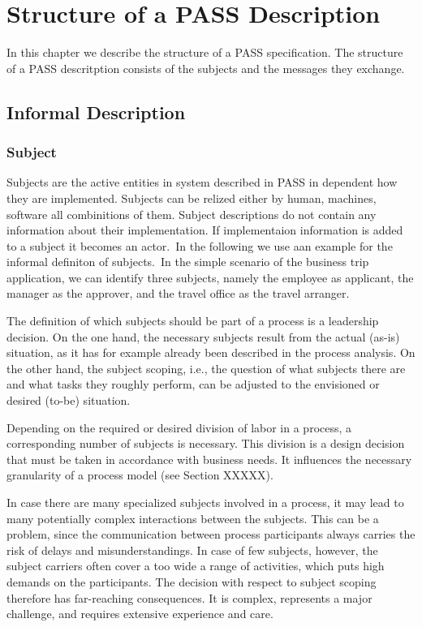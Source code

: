 \chapter{Structure of a PASS Description}
	In this chapter we describe the structure of a PASS specification. The structure of a PASS descritption consists of the subjects and the messages they exchange.

\section{Informal Description}
\subsection{Subject}

Subjects are the active entities in system described in PASS in dependent how they are implemented. Subjects can be relized either by human, machines, software all combinitions of them. Subject descriptions do not contain any information about their implementation. If implementaion information is added to a subject it becomes an actor.\
In the following we use aan example for the informal definiton of subjects.\
In the simple scenario of the business trip application, we can identify three subjects, namely the employee as applicant, the manager as the approver, and the travel office as the travel arranger.

The definition of which subjects should be part of a process is a leadership decision. On the one hand, the necessary subjects result from the actual (as-is) situation, as it has for example already been described in the process analysis. On the other hand, the subject scoping, i.e., the question of what subjects there are and what tasks they roughly perform, can be adjusted to the envisioned or desired (to-be) situation.

Depending on the required or desired division of labor in a process, a corresponding number of subjects is necessary. This division is a design decision that must be taken in accordance with business needs. It influences the necessary granularity of a process model (see Section XXXXX).

In case there are many specialized subjects involved in a process, it may lead to many potentially complex interactions between the subjects. This can be a problem, since the communication between process participants always carries the risk of delays and misunderstandings. In case of few subjects, however, the subject carriers often cover a too wide a range of activities, which puts high demands on the participants. The decision with respect to subject scoping therefore has far-reaching consequences. It is complex, represents a major challenge, and requires extensive experience and care.


